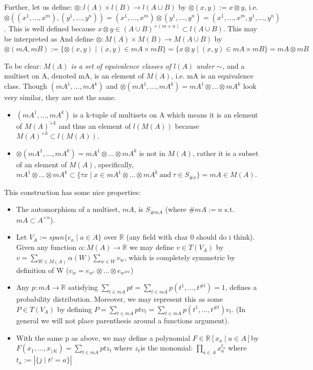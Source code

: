 \documentclass{article}
\theoremstyle{definition}
\begin{document}
Further, let us define:
$\otimes:l(A)\times l(B)\rightarrow l(A\cup B)$ by $\otimes(x,y):=x\otimes y $, i.e. $ \otimes((x^1,\dots,x^m),(y^1,\dots,y^n)) =  (x^1,\dots,x^m)\otimes(y^1,\dots,y^n) =(x^1,\dots,x^m,y^1,\dots,y^n)$. This is well defined because $x\otimes y \in (A\cup B)^{\times(m+n)} \subset l(A\cup B)$. This may be interpreted as 
And define $\otimes:M(A)\times M(B)\rightarrow M(A\cup B)$  by $\otimes(mA,mB):=\{\otimes(x,y) \mid (x,y)\in mA\times mB\} = \{x \otimes y \mid (x,y)\in mA\times mB\} = mA\otimes mB$

To be clear: \textit{$M(A)$ is a set of equivalence classes of $l(A)$ under $\sim$,} and a multiset on A, denoted mA, is an element of $M(A)$, i.e. mA is an equivalence class. Though $(mA^1,\dots,mA^k)$ and $\otimes(mA^1,\dots,mA^k)=mA^1\otimes\dots\otimes mA^k$ look very similar, they are not the same.
\begin{itemize}
\item $(mA^1,\dots,mA^k)$ is a k-tuple of multisets on A which means it is an element of $M(A)^{\times k}$ and thus an element of $l(M(A))$ because $M(A)^{\times k} \subset l(M(A))$.
\item $\otimes(mA^1,\dots,mA^k)=mA^1 \otimes\dots\otimes mA^k$ is not in $M(A)$, rather it is a subset of an element of $M(A)$, specifically, $mA^1 \otimes\dots\otimes mA^k \subset \{ \tau x \mid  x\in mA^1\otimes\dots\otimes mA^k \:\text{and}\: \tau \in S_{\#x} \} = mA \in M(A)$.
\end{itemize}
This construction has some nice properties:
\begin{itemize}
\item The automorphism of  a multiset, $mA$, is $S_{\#mA}$ (where $\#mA := n $ s.t.  $mA \subset A^{\times n}$).
\item Let $V_A := span\{e_a \mid a \in A\}$ over $\mathbb{R}$ (any field with char 0 should do i think). Given any function $\alpha:M(A)\rightarrow\mathbb{R}$ we may define $v \in T(V_A)$ by $v = \sum_{W \in M(A)} \alpha(W) \sum_{w\in W}v_w$, which is completely symmetric by definition of W ($v_w = e_{w^1}\otimes\dots\otimes e_{w^{\#w}}$)
\item Any $p:mA\rightarrow\mathbb{R}$ satisfying $\sum_{t\in mA} pt = \sum_{t\in mA} p(t^1,\dots,t^{\#t}) = 1$, defines a probability distribution. Moreover, we may represent this as some $P \in T(V_A)$ by defining $P=\sum_{t\in mA} ptv_t = \sum_{t\in mA} p(t^1,\dots,t^{\#t})v_t $. (In general we will not place parenthesis around a functions argument).
\item With the same p as above, we may define a polynomial $F\in \mathbb{R}[x_a \mid a \in A]$by $F(x_1,\dots,x_{|A|}) = \sum_{t\in mA} ptz_t$ where $z_t $is the monomial: $\prod_{a\in A} x_a^{t_a}$ where $t_a := |\{j \mid t^j = a\}|$
\end{itemize}
\end{document}
